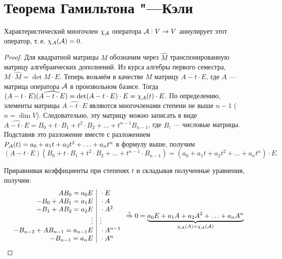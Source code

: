 \section{Теорема Гамильтона "---Кэли}

\begin{theorem}
    Характеристический многочлен $\chi_{\mathcal{A}}$ оператора $\mathcal{A}: V \to V$ аннулирует этот оператор, т.\,е. $\chi_{\mathcal{A}}(\mathcal{A}) = 0$.
\end{theorem}

\begin{proof}
    Для квадратной матрицы $M$ обозначим через $\widehat{M}$ транспонированную матрицу алгебраических дополнений. Из курса алгебры первого семестра, $M \cdot \widehat{M} = \det M \cdot E$. Теперь возьмём в качестве $M$ матрицу $A - t \cdot E$, где $A$ --- матрица оператора $\mathcal{A}$ в произвольном базисе. Тогда $(A - t \cdot E)(\widehat{A - t \cdot E}) = \det (A - t \cdot E) \cdot E = \chi_{\mathcal{A}}(t) \cdot E$. По определению, элементы матрицы $\widehat{A - t \cdot E}$ являются многочленами степени не выше $n - 1$ ($n = \dim V$). Следовательно, эту матрицу можно записать в виде $\widehat{A - t \cdot E} = B_0 + t \cdot B_1 + t^2 \cdot B_2 + \ldots + t^{n - 1}B_{n - 1}$, где $B_i$ --- числовые матрицы. Подставив это разложение вместе с разложением $P_{\mathcal{A}}(t) = a_0 + a_1t + a_2t^2 + \ldots + a_nt^n$ в формулу выше, получим
\[
    (A - t \cdot E)(B_0 + t \cdot B_1 + t^2 \cdot B_2 + \ldots + t^{n - 1} \cdot B_{n - 1}) = (a_0 + a_1t + a_2t^2 + \ldots + a_nt^n) \cdot E.
\]

Приравнивая коэффициенты при степенях $t$ и складывая полученные уравнения, получим:
\[
    \begin{array}{r | l}
        AB_0 = a_0E & {} \cdot E\\
        -B_0 + AB_1 = a_1E & {} \cdot A\\
        -B_1 + AB_2 = a_2E & {} \cdot A^2\\
        \vdots & \vdots\\
        -B_{n - 2} + AB_{n - 1} = a_{n - 1}E & {} \cdot A^{n - 1}\\
        -B_{n - 1} = a_nE & {} \cdot A^n
    \end{array} \overset{+}{\Rightarrow} 0 = \underbrace{a_0E + a_1A + a_2A^2 + \ldots + a_nA^n}_{\chi_{\mathcal{A}}(A) = \chi_{\mathcal{A}}(\mathcal{A})}
\]
\end{proof}

